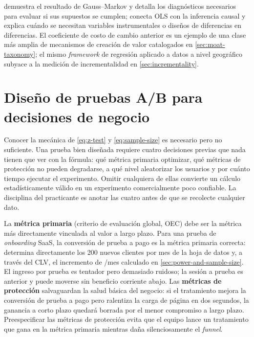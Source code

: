 \textcite{wooldridge2020introductory} demuestra el resultado de Gauss--Markov y detalla los
diagnósticos necesarios para evaluar si sus supuestos se cumplen; \textcite{angrist2009mostly}
conecta OLS con la inferencia causal y explica cuándo se necesitan variables instrumentales
o diseños de diferencias en diferencias. El coeficiente de costo de cambio anterior es un
ejemplo de una clase más amplia de mecanismos de creación de valor catalogados en
\cref{sec:moat-taxonomy}; el mismo \emph{framework} de regresión aplicado a datos a nivel
geográfico subyace a la medición de incrementalidad en \cref{sec:incrementality}.


\section{Diseño de pruebas A/B para decisiones de negocio}\label{sec:ab-test-design}

Conocer la mecánica de \cref{eq:z-test} y \cref{eq:sample-size} es necesario pero no
suficiente. Una prueba bien diseñada requiere cuatro decisiones previas que nada tienen que
ver con la fórmula: qué métrica primaria optimizar, qué métricas de protección no pueden
degradarse, a qué nivel aleatorizar los usuarios y por cuánto tiempo ejecutar el experimento.
Omitir cualquiera de ellas convierte un cálculo estadísticamente válido en un experimento
comercialmente poco confiable. La disciplina del practicante es anotar las cuatro antes de
que se recolecte cualquier dato.

La \textbf{métrica primaria} (criterio de evaluación global, OEC) debe ser la métrica más
directamente vinculada al valor a largo plazo. Para una prueba de \emph{onboarding} SaaS,
la conversión de prueba a pago es la métrica primaria correcta: determina directamente los
\num{200} nuevos clientes por mes de la hoja de datos y, a través del CLV, el incremento de
/mes calculado en \cref{sec:power-and-sample-size}. El ingreso por prueba es
tentador pero demasiado ruidoso; la sesión a prueba es anterior y puede moverse sin beneficio
corriente abajo. Las \textbf{métricas de protección} salvaguardan la salud básica del negocio:
si el tratamiento mejora la conversión de prueba a pago pero ralentiza la carga de página en
dos segundos, la ganancia a corto plazo quedará borrada por el menor compromiso a largo plazo.
Preespecificar las métricas de protección evita que el equipo lance un tratamiento que gana
en la métrica primaria mientras daña silenciosamente el \emph{funnel}.

